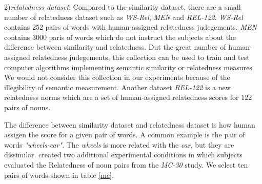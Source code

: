 2)\emph{relatedness dataset}:
Compared to the similarity dataset, there are a small number of relatedness dataset such as
\emph{WS-Rel}, \emph{MEN} and \emph{REL-122}. \emph{WS-Rel} contains 252 pairs of words with
human-assigned relatedness judegements. \emph{MEN} contains 3000 paris of words which do not
instruct the subjects about the difference between similarity and relatedness. 
Dut the great number of human-assigned relatedness judegements, this collection can
be used to train and test computer algorithms implementing semantic similarity or relatedness measures.
We would not consider this collection in our experiments because of the illegibility of semantic measurement.
Another dataset \emph{REL-122} is a new relatedness norms which are a set of human-assigned relatedness scores
for 122 pairs of nouns.

The difference between similarity dataset and relatedness dataset is how human assigen the score for a
given pair of words. A common example is the pair of words \emph{"wheels-car"}. The \emph{wheels} is more related
with the \emph{car}, but they are dissimilar. \cite{acl/SzumlanskiGS13} created two additional experimental 
conditions in which subjects evaluated the Relatedness of noun pairs from the \emph{MC-30} study. We select 
ten pairs of words shown in table \ref{mc}. 


